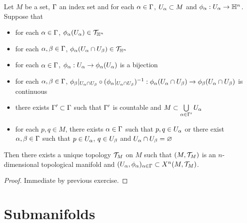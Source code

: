 \documentclass{book}
\begin{document}
	\begin{ex} 
		Let $M$ be a set, $\Gamma$ an index set and for each $\alpha \in \Gamma$, $U_{\alpha} \subset M$ and $\phi_{\alpha}: U_{\alpha} \rightarrow \mathbb{H}^n$. Suppose that 
		\begin{itemize}
			\item for each $\alpha \in \Gamma$, $\phi_{\alpha}(U_{\alpha}) \in \mathcal{T}_{\mathbb{H}^n}$ 
			\item for each $\alpha, \beta \in \Gamma$, $\phi_{\alpha}(U_{\alpha} \cap U_{\beta}) \in \mathcal{T}_{\mathbb{H}^n}$
			\item for each $\alpha \in \Gamma$, $\phi_{\alpha}: U_{\alpha} \rightarrow \phi_{\alpha}(U_{\alpha})$ is a bijection
			\item for each $\alpha, \beta \in \Gamma$, $\phi_{\beta}|_{U_{\alpha} \cap U_{\beta}} \circ (\phi_{\alpha}|_{U_{\alpha} \cap U_{\beta}})^{-1}: \phi_{\alpha}(U_{\alpha} \cap U_{\beta}) \rightarrow \phi_{\beta}(U_{\alpha} \cap U_{\beta})$ is continuous
			\item there exists $\Gamma' \subset \Gamma$ such that $\Gamma'$ is countable and $M \subset \bigcup\limits_{\alpha \in \Gamma'} U_{\alpha}$
			\item for each $p,q \in M$, there exists $\alpha \in \Gamma$ such that $p,q \in U_{\alpha}$ or there exist $\alpha,\beta \in \Gamma$ such that $p \in U_{\alpha}$, $q \in U_{\beta}$ and $U_{\alpha} \cap U_{\beta} = \varnothing$
		\end{itemize}
		Then there exists a unique topology $\mathcal{T}_M$ on $M$ such that $(M, \mathcal{T}_M)$ is an $n$-dimensional topological manifold and $(U_{\alpha}, \phi_{\alpha})_{\alpha \in \Gamma} \subset X^n(M, \mathcal{T}_M)$.
	\end{ex}
	
	\begin{proof}
		Immediate by previous exercise. 
	\end{proof}
	

























	\newpage
	\section{Submanifolds}
	
\end{document}
